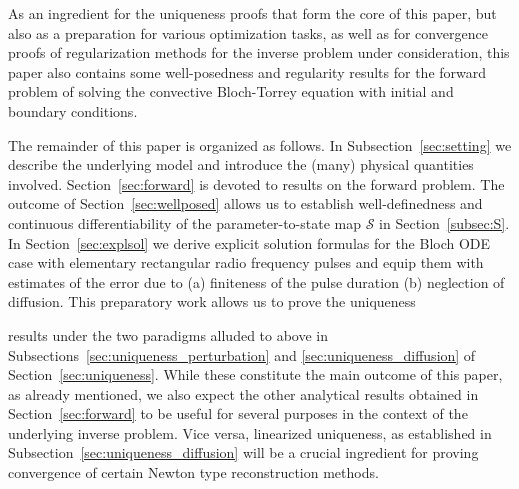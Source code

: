 \documentclass{ws-m3as}
\newcommand{\revision}[1]{{ #1}}
\newcommand{\revisionown}[1]{{ #1}}
\newcommand{\Margin}[1]{}
\begin{document}
As an ingredient for the uniqueness proofs \revisionown{that form the core of this paper}, but also as a preparation for various  optimization tasks, as well as for convergence proofs of regularization methods for the inverse problem under consideration,
this paper also contains some well-posedness and regularity results for the forward problem of solving the convective Bloch-Torrey equation with initial and boundary conditions. 

\medskip

The remainder of this paper is organized as follows.
In Subsection~\ref{sec:setting} we describe the underlying model and introduce the (many) physical quantities involved.
Section~\ref{sec:forward} is devoted to results on the forward problem. 
The outcome of Section~\ref{sec:wellposed} allows us to establish well-definedness and continuous differentiability of the parameter-to-state map $\mathcal{S}$ in Section~\ref{subsec:S}.
In Section~\ref{sec:explsol} we derive explicit solution formulas for the Bloch ODE case with elementary rectangular radio frequency pulses and equip them with estimates of the error due to (a) finiteness of the pulse duration (b) neglection of diffusion.
This preparatory work allows us to prove the 
\revision{uniqueness}
\Margin{R2 1)} 
results under the two paradigms alluded to above in Subsections~\ref{sec:uniqueness_perturbation} and \ref{sec:uniqueness_diffusion} of Section~\ref{sec:uniqueness}. 
While these constitute the main outcome of this paper, as already mentioned, we also expect the other analytical results obtained in Section~\ref{sec:forward} to be useful for several purposes in the context of the underlying inverse problem. Vice versa, linearized uniqueness, as established in Subsection~\ref{sec:uniqueness_diffusion} will be a crucial ingredient for proving convergence of certain Newton type reconstruction methods.  

\medskip
\end{document}
